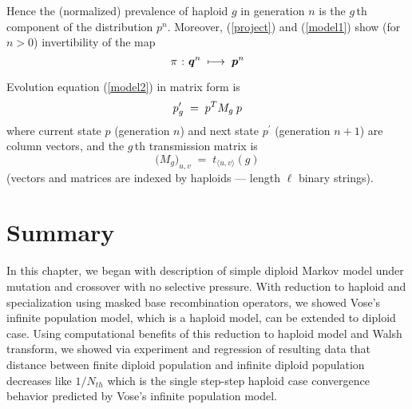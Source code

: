 Hence the (normalized) prevalence of haploid $g$ in generation $n$ is
the $g\,$th component of the distribution $p^n$. \linebreak
Moreover, (\ref{project}) and (\ref{model1}) show (for $n >
0$) invertibility of the map
\[
  \pi \hspace{0.01in} : \hspace{0.01in} {\bm q}^{n} \; \longmapsto \; {\bm p}^{n}
\]

Evolution equation (\ref{model2}) in matrix form is
\begin{equation}
\label{model3}
p_g^\prime \; = \; p^T M_g \,\hspace{0.01in} p
\end{equation}
where current state $p$ (generation $n$) and next state $p^\prime$
(generation $n+1$) are column vectors, and the $g\,$th transmission
matrix is
\begin{equation} \label{Mg}
\Big(M_g \Big)_{u,v} \; = \; t_{\langle u, v \rangle}(g)
\end{equation}
(vectors and matrices are indexed by haploids --- length $\ell$ binary
strings).





\section{Summary}
In this chapter, we began with description of simple diploid Markov model under mutation and crossover with no selective pressure. With reduction to haploid and specialization using masked base recombination operators, we showed Vose's infinite population model, which is a haploid model, can be extended to diploid case. Using computational benefits of this reduction to haploid model and Walsh transform, we showed via experiment and regression of resulting data that distance between finite diploid population and infinite diploid population decreases like $1/N_{th}$ which is the single step-step haploid case convergence behavior predicted by Vose's infinite population model.






